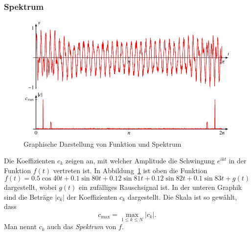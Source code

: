 \subsubsection{Spektrum}
\begin{figure}
\centering
\includegraphics{chapters/6/spektrum.pdf}
\caption{Graphische Darstellung von Funktion und Spektrum
\label{skript:komplex:spektrum}}
\end{figure}
Die Koeffizienten $c_k$ zeigen an, mit welcher Amplitude die Schwingung
$e^{ikt}$ in der Funktion $f(t)$ vertreten ist.
In Abbildung~\ref{skript:komplex:spektrum} ist oben die Funktion 
\[
f(t)
=
0.5 \cos 40t
+0.1\sin 80t
+0.12\sin 81t
+0.12\sin 82t
+0.1\sin 83t
+g(t)
\]
dargestellt, wobei $g(t)$ ein zufälliges Rauschsignal ist.
In der unteren Graphik sind die Beträge $|c_k|$ der Koeffizienten $c_k$ 
dargestellt.
Die Skala ist so gewählt, dass
\[
c_{\text{max}} = \max_{1\le k\le N} |c_k|.
\]
Man nennt $c_k$ auch das {\em Spektrum} von $f$.
%

